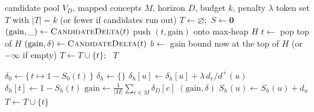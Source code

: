 \begin{algorithm}[h]
\caption{\textsc{SelectTokens} -- lazy-greedy token selection}
\label{alg:select-tokens}
\begin{algorithmic}[1]
\Require candidate pool $V_D$, mapped concepts $M$, horizon $D$, budget $k$, penalty $\lambda$
\Ensure token set $T$ with $|T| = k$ (or fewer if candidates run out)
\State $T \gets \varnothing$;\ $S \gets \mathbf{0}$ 
 
    \State $(\text{gain}, \_) \gets \Call{CandidateDelta}{t}$
    \State push $(t, \text{gain})$ onto max-heap $H$
\EndFor
{}
    \Repeat
        \State $t \gets$ pop top of $H$
        \State $(\text{gain}, \delta) \gets \Call{CandidateDelta}{t}$ 
        \State $b \gets$ gain bound now at the top of $H$ (or $-\infty$ if empty)
     
    \State $T \gets T \cup \{t\}$;\ 
\EndWhile
\State \Return $T$
\end{algorithmic}
\end{algorithm}

\begin{algorithm}[h]
\caption{\textsc{CandidateDelta} and \textsc{Commit} -- sparse incremental update}
\label{alg:candidate-delta}
\begin{algorithmic}[1]
    \State $\delta_0 \gets \{\, t \mapsto 1 - S_0(t) \,\}$ 
        \State $\delta_h \gets \{\}$
                \State $\delta_h[u] \gets \delta_h[u] + \lambda\, d_v / d^+(u)$ 
            \EndFor
        \EndFor
        \State $\delta_h[t] \gets 1 - S_h(t)$ 
    \EndFor
    \State $\text{gain} \gets \frac{1}{|M|}\sum_{c \in M} \delta_D[c]$
    \State \Return $(\text{gain}, \delta)$
\EndFunction
{}
            \State $S_h(u) \gets S_h(u) + d_u$
        \EndFor
    \EndFor
    \State $T \gets T \cup \{t\}$
\EndFunction
\end{algorithmic}
\end{algorithm}

